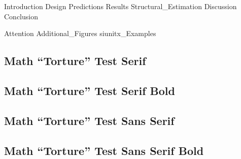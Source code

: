 \documentclass[a4paper, 10pt]{article}
\begin{document}

 \frenchspacing



{Introduction}
{Design}
{Predictions}
{Results}
{Structural_Estimation}
{Discussion}
{Conclusion}

\clearpage

\begin{appendices}
	\label{sec:appendix}
	\FloatBarrier
	{Attention}
	\FloatBarrier
	\newpage
	{Additional_Figures}
	\FloatBarrier
	{siunitx_Examples}
	\FloatBarrier
	\newpage
	{%
		\setlength{\parindent}{0cm}

		

		\newpage
		\renewcommand{\showfamily}{{\color{magenta}%
			Serif%
		}}
		{\rmfamily\mdseries%
		 \subsection{Math ``Torture'' Test \showfamily}
	 	}

		\newpage
		\renewcommand{\showfamily}{{\color{magenta}%
			Serif Bold%
		}}
		{\rmfamily\bfseries%
		 \subsection{Math ``Torture'' Test \showfamily}
		}

		\newpage
		\renewcommand{\showfamily}{{\color{magenta}%
			Sans Serif%
		}}
		{\sffamily\mdseries%
		 \subsection{Math ``Torture'' Test \showfamily}
		}

		\newpage
		\renewcommand{\showfamily}{{\color{magenta}%
			Sans Serif Bold%
		}}
		{\sffamily\bfseries%
		 \subsection{Math ``Torture'' Test \showfamily}
		}%
	}
\end{appendices}
\end{document}
